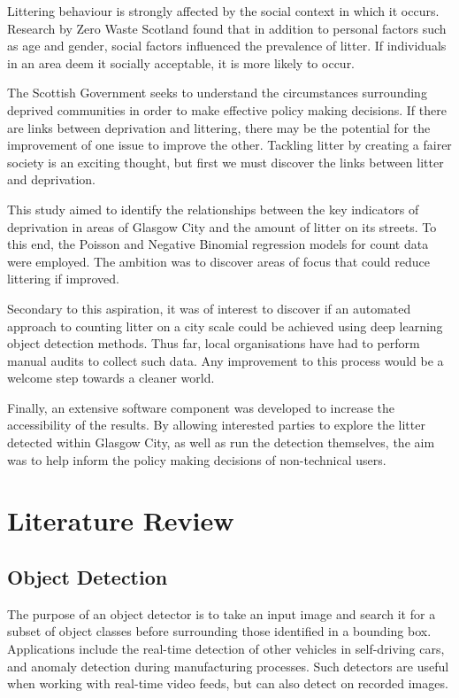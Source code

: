 \documentclass{thesis}
\begin{document}
Littering behaviour is strongly affected by the social context in which it occurs\cite{littering-behaviour}. Research by Zero Waste Scotland found that in addition to personal factors such as age and gender, social factors influenced the prevalence of litter. If individuals in an area deem it socially acceptable, it is more likely to occur. 

The Scottish Government seeks to understand the circumstances surrounding deprived communities in order to make effective policy making decisions. If there are links between deprivation and littering, there may be the potential for the improvement of one issue to improve the other. Tackling litter by creating a fairer society is an exciting thought, but first we must discover the links between litter and deprivation.

This study aimed to identify the relationships between the key indicators of deprivation in areas of Glasgow City and the amount of litter on its streets. To this end, the Poisson and Negative Binomial regression models for count data were employed. The ambition was to discover areas of focus that could reduce littering if improved.

Secondary to this aspiration, it was of interest to discover if an automated approach to counting litter on a city scale could be achieved using deep learning object detection methods. Thus far, local organisations have had to perform manual audits to collect such data. Any improvement to this process would be a welcome step towards a cleaner world.

Finally, an extensive software component was developed to increase the accessibility of the results. By allowing interested parties to explore the litter detected within Glasgow City, as well as run the detection themselves, the aim was to help inform the policy making decisions of non-technical users.


\chapter{Literature Review}

\section{Object Detection}

The purpose of an object detector is to take an input image and search it for a subset of object classes before surrounding those identified in a bounding box. Applications include the real-time detection of other vehicles in self-driving cars, and anomaly detection during manufacturing processes. Such detectors are useful when working with real-time video feeds, but can also detect on recorded images. 
\end{document}
